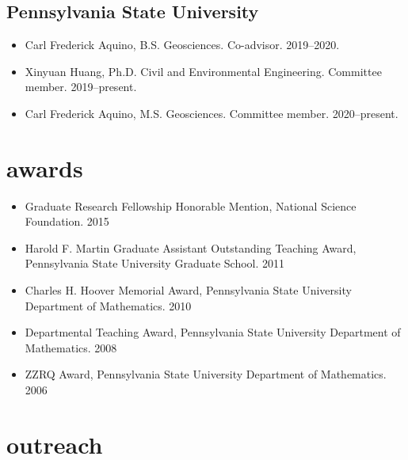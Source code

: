 \documentclass[11pt,article,oneside]{memoir}
\begin{document}
\subsection{Pennsylvania State University}
\begin{itemize}[label={}]

\item Carl Frederick Aquino, B.S. Geosciences. Co-advisor. 2019--2020.

\item Xinyuan Huang, Ph.D. Civil and Environmental Engineering. Committee member. 2019--present.

\item Carl Frederick Aquino, M.S. Geosciences. Committee member. 2020--present.

\end{itemize}



\section{awards}

\mbox{}\vspace{-\dimexpr\baselineskip\relax}

\begin{itemize}[label={}]

\item Graduate Research Fellowship Honorable Mention, National Science Foundation. 2015

\item Harold F. Martin Graduate Assistant Outstanding Teaching Award, Pennsylvania State University Graduate School. 2011

\item Charles H. Hoover Memorial Award, Pennsylvania State University Department of Mathematics. 2010

\item Departmental Teaching Award, Pennsylvania State University Department of Mathematics. 2008

\item ZZRQ Award, Pennsylvania State University Department of Mathematics. 2006

\end{itemize}


\section{outreach}
\end{document}
